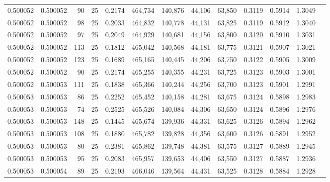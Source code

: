 \begin{tabular}{rrrrrrrrrrrrr}
0.500052 & 0.500052 &    90 &  25 &                                     0.2174 & 464,734 & 140,876 &  44,106 &  63,850 & 0.3119 & 0.5914 & 1.3049 \\
0.500052 & 0.500052 &    98 &  25 &                                     0.2033 & 464,832 & 140,778 &  44,131 &  63,825 & 0.3119 & 0.5912 & 1.3040 \\
0.500052 & 0.500052 &    97 &  25 &                                     0.2049 & 464,929 & 140,681 &  44,156 &  63,800 & 0.3120 & 0.5910 & 1.3031 \\
0.500052 & 0.500052 &   113 &  25 &                                     0.1812 & 465,042 & 140,568 &  44,181 &  63,775 & 0.3121 & 0.5907 & 1.3021 \\
0.500052 & 0.500052 &   123 &  25 &                                     0.1689 & 465,165 & 140,445 &  44,206 &  63,750 & 0.3122 & 0.5905 & 1.3009 \\
0.500052 & 0.500052 &    90 &  25 &                                     0.2174 & 465,255 & 140,355 &  44,231 &  63,725 & 0.3123 & 0.5903 & 1.3001 \\
0.500052 & 0.500053 &   111 &  25 &                                     0.1838 & 465,366 & 140,244 &  44,256 &  63,700 & 0.3123 & 0.5901 & 1.2991 \\
0.500053 & 0.500053 &    86 &  25 &                                     0.2252 & 465,452 & 140,158 &  44,281 &  63,675 & 0.3124 & 0.5898 & 1.2983 \\
0.500053 & 0.500053 &    74 &  25 &                                     0.2525 & 465,526 & 140,084 &  44,306 &  63,650 & 0.3124 & 0.5896 & 1.2976 \\
0.500053 & 0.500053 &   148 &  25 &                                     0.1445 & 465,674 & 139,936 &  44,331 &  63,625 & 0.3126 & 0.5894 & 1.2962 \\
0.500053 & 0.500053 &   108 &  25 &                                     0.1880 & 465,782 & 139,828 &  44,356 &  63,600 & 0.3126 & 0.5891 & 1.2952 \\
0.500053 & 0.500053 &    80 &  25 &                                     0.2381 & 465,862 & 139,748 &  44,381 &  63,575 & 0.3127 & 0.5889 & 1.2945 \\
0.500053 & 0.500053 &    95 &  25 &                                     0.2083 & 465,957 & 139,653 &  44,406 &  63,550 & 0.3127 & 0.5887 & 1.2936 \\
0.500053 & 0.500054 &    89 &  25 &                                     0.2193 & 466,046 & 139,564 &  44,431 &  63,525 & 0.3128 & 0.5884 & 1.2928 \\

\end{tabular}
